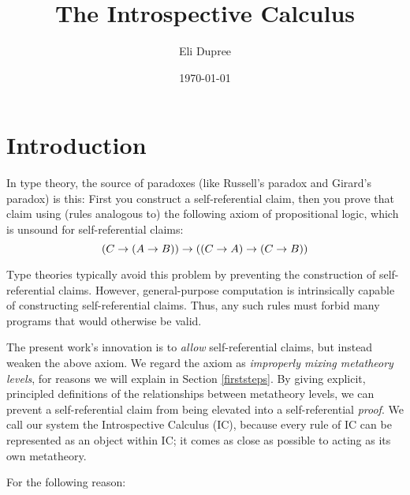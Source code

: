\documentclass{article}
\title{The Introspective Calculus}
\author{Eli Dupree}
\date{\today}
\begin{document}
  \maketitle
  
  \section{Introduction}
  
  
  In type theory, the source of paradoxes (like Russell's paradox and Girard's paradox) is this: First you construct a self-referential claim, then you prove that claim using (rules analogous to) the following axiom of propositional logic, which is unsound for self-referential claims:
  \begin{equation}
    \label{unsoundaxiom}
    (C \to (A \to B)) \to ((C \to A) \to (C \to B))
    \vspace{0.8em}
  \end{equation}
  
  Type theories typically avoid this problem by preventing the construction of self-referential claims.
  However, general-purpose computation is intrinsically capable of constructing self-referential claims.
  Thus, any such rules must forbid many programs that would otherwise be valid.

  The present work's innovation is to \emph{allow} self-referential claims, but instead weaken the above axiom.
  We regard the axiom as \emph{improperly mixing metatheory levels}, for reasons we will explain in Section \ref{firststeps}.
  By giving explicit, principled definitions of the relationships between metatheory levels, we can prevent a self-referential claim from being elevated into a self-referential \emph{proof}.
  We call our system the Introspective Calculus (IC), because every rule of IC can be represented as an object within IC; it comes as close as possible to acting as its own metatheory.
  
  \iffalse
  For the following reason:
  
\end{document}
